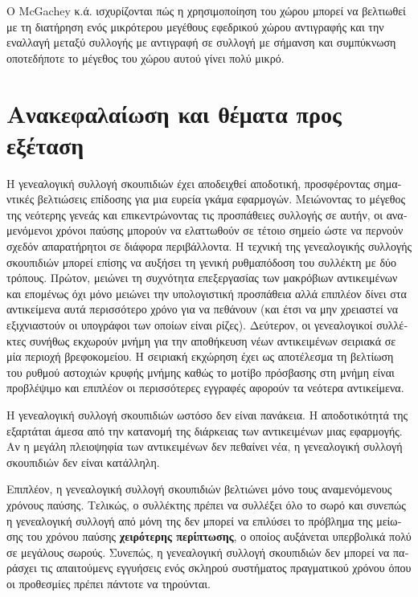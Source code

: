 \begin{greek}
Ο McGachey κ.ά. \cite{DBLP:conf/iwmm/McGacheyH06} ισχυρίζονται
πώς η χρησιμοποίηση του χώρου μπορεί να βελτιωθεί με τη διατήρηση
ενός μικρότερου μεγέθους εφεδρικού χώρου αντιγραφής και την
εναλλαγή μεταξύ συλλογής με αντιγραφή σε συλλογή με σήμανση και
συμπύκνωση οποτεδήποτε το μέγεθος του χώρου αυτού γίνει πολύ
μικρό. 

\section{Ανακεφαλαίωση και θέματα προς εξέταση}
Η γενεαλογική συλλογή σκουπιδιών έχει αποδειχθεί αποδοτική,
προσφέροντας σημαντικές βελτιώσεις επίδοσης για μια ευρεία
γκάμα εφαρμογών. Μειώνοντας το μέγεθος της νεότερης γενεάς
και επικεντρώνοντας τις προσπάθειες συλλογής σε αυτήν, οι
αναμενόμενοι χρόνοι παύσης μπορούν να ελαττωθούν σε τέτοιο
σημείο ώστε να περνούν σχεδόν απαρατήρητοι σε διάφορα περιβάλλοντα.
Η τεχνική της γενεαλογικής συλλογής σκουπιδιών μπορεί επίσης
να αυξήσει τη γενική ρυθμαπόδοση του συλλέκτη με δύο τρόπους.
Πρώτον, μειώνει τη συχνότητα επεξεργασίας των μακρόβιων αντικειμένων
και επομένως όχι μόνο μειώνει την υπολογιστική προσπάθεια αλλά
επιπλέον δίνει στα αντικείμενα αυτά περισσότερο χρόνο για να
πεθάνουν (και έτσι να μην χρειαστεί να εξιχνιαστούν οι υπογράφοι
των οποίων είναι ρίζες). Δεύτερον, οι γενεαλογικοί συλλέκτες
συνήθως εκχωρούν μνήμη για την αποθήκευση νέων αντικειμένων
σειριακά σε μία περιοχή βρεφοκομείου. Η σειριακή εκχώρηση έχει
ως αποτέλεσμα τη βελτίωση του ρυθμού αστοχιών κρυφής μνήμης
καθώς το μοτίβο πρόσβασης στη μνήμη είναι προβλέψιμο και
επιπλέον οι περισσότερες εγγραφές αφορούν τα νεότερα αντικείμενα.

Η γενεαλογική συλλογή σκουπιδιών ωστόσο δεν είναι πανάκεια.
Η αποδοτικότητά της εξαρτάται άμεσα από την κατανομή της διάρκειας
των αντικειμένων μιας εφαρμογής. Αν η μεγάλη πλειοψηφία των
αντικειμένων δεν πεθαίνει νέα, η γενεαλογική συλλογή σκουπιδιών
δεν είναι κατάλληλη.

Επιπλέον, η γενεαλογική συλλογή σκουπιδιών βελτιώνει μόνο
τους αναμενόμενους χρόνους παύσης. Τελικώς, ο συλλέκτης πρέπει
να συλλέξει όλο το σωρό και συνεπώς η γενεαλογική συλλογή από
μόνη της δεν μπορεί να επιλύσει το πρόβλημα της μείωσης του
χρόνου παύσης \textbf{χειρότερης περίπτωσης}, ο οποίος αυξάνεται
υπερβολικά πολύ σε μεγάλους σωρούς. Συνεπώς, η γενεαλογική
συλλογή σκουπιδιών δεν μπορεί να παράσχει τις απαιτούμενς εγγυήσεις
ενός σκληρού συστήματος πραγματικού χρόνου όπου οι προθεσμίες
πρέπει πάντοτε να τηρούνται.


\end{greek}
